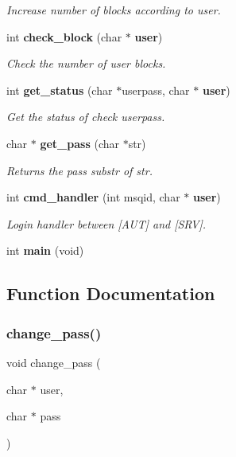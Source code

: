 \begin{DoxyCompactItemize}
\begin{DoxyCompactList}\small\item\em Increase number of blocks according to user. \end{DoxyCompactList}\item 
int \textbf{ check\+\_\+block} (char $\ast$\textbf{ user})
\begin{DoxyCompactList}\small\item\em Check the number of user blocks. \end{DoxyCompactList}\item 
int \textbf{ get\+\_\+status} (char $\ast$userpass, char $\ast$\textbf{ user})
\begin{DoxyCompactList}\small\item\em Get the status of check userpass. \end{DoxyCompactList}\item 
char $\ast$ \textbf{ get\+\_\+pass} (char $\ast$str)
\begin{DoxyCompactList}\small\item\em Returns the pass substr of str. \end{DoxyCompactList}\item 
int \textbf{ cmd\+\_\+handler} (int msqid, char $\ast$\textbf{ user})
\begin{DoxyCompactList}\small\item\em Login handler between [A\+UT] and [S\+RV]. \end{DoxyCompactList}\item 
int \textbf{ main} (void)
\end{DoxyCompactItemize}


\subsection{Function Documentation}
\mbox{\label{auth_8c_a94e83fe1538f3e714f97775e42b00843}} 
\subsubsection{change\+\_\+pass()}
{\footnotesize\ttfamily void change\+\_\+pass (\begin{DoxyParamCaption}\item[{char $\ast$}]{user,  }\item[{char $\ast$}]{pass }\end{DoxyParamCaption})}



